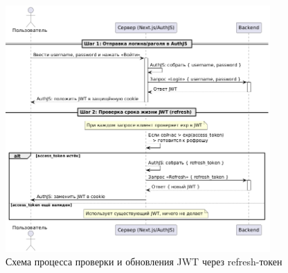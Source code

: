 \begin{figure}[H]
    \centering
    \includegraphics[width=0.9\textwidth]{static/diagrams/AuthRefresh.png}
    \caption{Схема процесса проверки и обновления JWT через refresh-токен}
    \label{fig:auth-refresh}
\end{figure}

